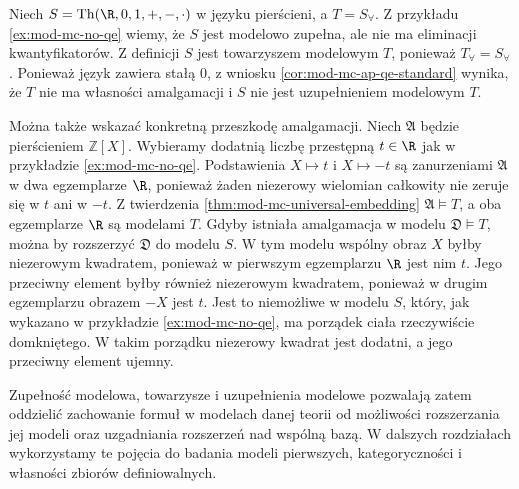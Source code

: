 \begin{przyklad}
\label{ex:mod-mc-no-ap}
Niech $S=\operatorname{Th}(\R,0,1,+,-,\cdot)$
w języku pierścieni, a $T=S_{\forall}$.
Z przykładu \ref{ex:mod-mc-no-qe} wiemy, że $S$
jest modelowo zupełna, ale nie ma eliminacji
kwantyfikatorów. Z definicji $S$ jest towarzyszem
modelowym $T$, ponieważ $T_{\forall}=S_{\forall}$.
Ponieważ język zawiera stałą $0$, z wniosku
\ref{cor:mod-mc-ap-qe-standard} wynika, że $T$
nie ma własności amalgamacji i $S$ nie jest
uzupełnieniem modelowym $T$.

Można także wskazać konkretną przeszkodę amalgamacji.
Niech $\mathfrak A$ będzie pierścieniem
$\mathbb Z[X]$. Wybieramy dodatnią liczbę przestępną
$t\in\R$ jak w przykładzie \ref{ex:mod-mc-no-qe}.
Podstawienia $X\mapsto t$ i $X\mapsto -t$ są
zanurzeniami $\mathfrak A$ w dwa egzemplarze $\R$,
ponieważ żaden niezerowy wielomian całkowity
nie zeruje się w $t$ ani w $-t$.
Z twierdzenia \ref{thm:mod-mc-universal-embedding}
$\mathfrak A\models T$, a oba egzemplarze $\R$
są modelami $T$. Gdyby istniała amalgamacja w
modelu $\mathfrak D\models T$, można by rozszerzyć
$\mathfrak D$ do modelu $S$.
W tym modelu wspólny obraz $X$ byłby niezerowym
kwadratem, ponieważ w pierwszym egzemplarzu $\R$
jest nim $t$. Jego przeciwny element byłby również
niezerowym kwadratem, ponieważ w drugim egzemplarzu
obrazem $-X$ jest $t$. Jest to niemożliwe w modelu
$S$, który, jak wykazano w przykładzie
\ref{ex:mod-mc-no-qe}, ma porządek ciała rzeczywiście
domkniętego. W takim porządku niezerowy kwadrat
jest dodatni, a jego przeciwny element ujemny.
\end{przyklad}

Zupełność modelowa, towarzysze i uzupełnienia modelowe
pozwalają zatem oddzielić zachowanie formuł w modelach
danej teorii od możliwości rozszerzania jej modeli
oraz uzgadniania rozszerzeń nad wspólną bazą.
W dalszych rozdziałach wykorzystamy te pojęcia
do badania modeli pierwszych, kategoryczności
i własności zbiorów definiowalnych.



